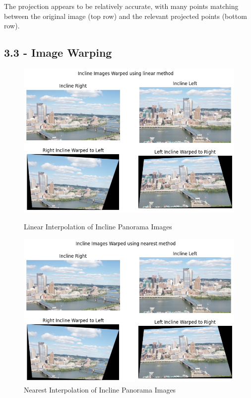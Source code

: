 \documentclass{article}
\begin{document}
The projection appears to be relatively accurate, with many points matching between the original image (top row) and the relevant projected points (bottom row).

\subsection*{3.3 - Image Warping}

\begin{figure}[h!]
    \centering
    \begin{minipage}{0.45\textwidth}
        \centering
        \includegraphics[width=\textwidth]{../output/3.3_linear.png}
        \caption{Linear Interpolation of Incline Panorama Images}
        \label{fig:3_3_linear}
    \end{minipage}
    \hfill
    \begin{minipage}{0.45\textwidth}
        \centering
        \includegraphics[width=\textwidth]{../output/3.3_nearest.png}
        \caption{Nearest Interpolation of Incline Panorama Images}
        \label{fig:3_3_nearest}
    \end{minipage}
\end{figure}
\end{document}
